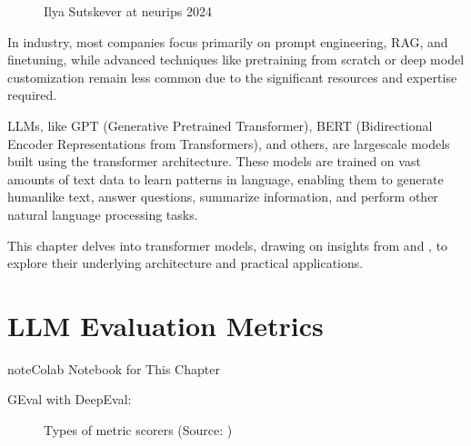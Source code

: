 \documentclass[letterpaper,11pt,english]{sphinxmanual}
\begin{document}
\begin{figure}[htbp]
\centering
\capstart

\noindent{}
\caption{Ilya Sutskever at neurips 2024}\label{\detokenize{pretraining:id1}}\label{\detokenize{pretraining:fig-rag}}\end{figure}

\sphinxAtStartPar
In industry, most companies focus primarily on prompt engineering, RAG, and fine\sphinxhyphen{}tuning,
while advanced techniques like pre\sphinxhyphen{}training from scratch or deep model customization
remain less common due to the significant resources and expertise required.

\sphinxAtStartPar
LLMs, like GPT (Generative Pre\sphinxhyphen{}trained Transformer), BERT (Bidirectional Encoder
Representations from Transformers), and others, are large\sphinxhyphen{}scale models built using
the transformer architecture. These models are trained on vast amounts of text data to
learn patterns in language, enabling them to generate human\sphinxhyphen{}like text, answer questions,
summarize information, and perform other natural language processing tasks.

\sphinxAtStartPar
This chapter delves into transformer models, drawing on insights from
 and , to explore their underlying architecture and practical applications.

\sphinxstepscope


\chapter{LLM Evaluation Metrics}
\label{\detokenize{evaluation:llm-evaluation-metrics}}\label{\detokenize{evaluation:evaluation}}\label{\detokenize{evaluation::doc}}
\begin{sphinxadmonition}{note}{Colab Notebook for This Chapter}

\sphinxAtStartPar
GEval with DeepEval: 
\end{sphinxadmonition}

\begin{figure}[htbp]
\centering
\capstart

\noindent{}
\caption{Types of metric scorers (Source: )}\label{\detokenize{evaluation:id3}}\label{\detokenize{evaluation:fig-metrics-llm}}\end{figure}
\end{document}
